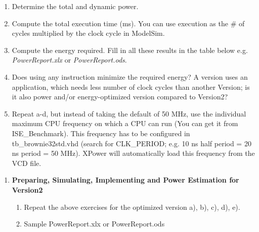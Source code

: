 \documentclass[
]{article}
\begin{document}
\begin{enumerate}
\def\labelenumi{\alph{enumi})}
\item
  Determine the total and dynamic power.
\item
  Compute the total execution time (ms). You can use execution as the \#
  of cycles multiplied by the clock cycle in ModelSim.
\item
  Compute the energy required. Fill in all these results in the table
  below e.g. \emph{PowerReport.xlx} or \emph{PowerReport.ods}.
\item
  Does using any instruction minimize the required energy? A version
  uses an application, which needs less number of clock cycles than
  another Version; is it also power and/or energy-optimized version
  compared to Version2?
\item
  Repeat a-d, but instead of taking the default of 50 MHz, use the
  individual maximum CPU frequency on which a CPU can run (You can get
  it from ISE\_Benchmark). This frequency has to be configured in
  tb\_brownie32std.vhd (search for CLK\_PERIOD; e.g. 10 ns half period =
  20 ns period = 50 MHz). XPower will automatically load this frequency
  from the VCD file.
\end{enumerate}

\begin{enumerate}
\def\labelenumi{\arabic{enumi}.}
\setcounter{enumi}{3}
\item
  \textbf{Preparing, Simulating, Implementing and Power Estimation for
  Version2}

  \begin{enumerate}
  \def\labelenumii{\arabic{enumii}.}
  \item
    Repeat the above exercises for the optimized version a), b), c), d),
    e).
  \item
    Sample PowerReport.xlx or PowerReport.ods
  \end{enumerate}
\end{enumerate}
\end{document}
